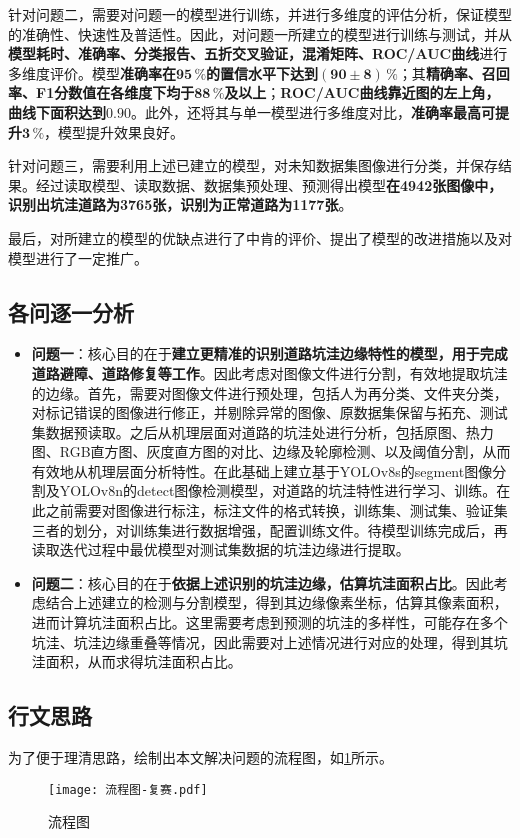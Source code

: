 \documentclass{MathorCupmodeling}
\begin{document}
		{\heiti 针对问题二}，需要对问题一的模型进行训练，并进行多维度的评估分析，保证模型的准确性、快速性及普适性。因此，对问题一所建立的模型进行训练与测试，并从\textbf{模型耗时、准确率、分类报告、五折交叉验证，混淆矩阵、ROC/AUC曲线}进行多维度评价。模型\textbf{准确率在$\boldsymbol{95\,\%}$的置信水平下达到$\boldsymbol{\left(90\pm 8\right)\,\%}$}；其\textbf{精确率、召回率、F1分数值在各维度下均于$\boldsymbol{88\,\%}$及以上}；\textbf{ROC/AUC曲线靠近图的左上角，曲线下面积达到$\boldsymbol{0.90}$}。此外，还将其与单一模型进行多维度对比，\textbf{准确率最高可提升$\boldsymbol{3\,\%}$}，模型提升效果良好。

		{\heiti 针对问题三}，需要利用上述已建立的模型，对未知数据集图像进行分类，并保存结果。经过读取模型、读取数据、数据集预处理、预测得出模型\textbf{在4942张图像中，识别出坑洼道路为3765张，识别为正常道路为1177张}。
		
		{\heiti 最后}，对所建立的模型的优缺点进行了中肯的评价、提出了模型的改进措施以及对模型进行了一定推广。
	\subsection{各问逐一分析}
	\begin{itemize}
		\item \textbf{问题一}：核心目的在于\textbf{建立更精准的识别道路坑洼边缘特性的模型，用于完成道路避障、道路修复等工作}。因此考虑对图像文件进行分割，有效地提取坑洼的边缘。首先，需要对图像文件进行预处理，包括人为再分类、文件夹分类，对标记错误的图像进行修正，并剔除异常的图像、原数据集保留与拓充、测试集数据预读取。之后从机理层面对道路的坑洼处进行分析，包括原图、热力图、RGB直方图、灰度直方图的对比、边缘及轮廓检测、以及阈值分割，从而有效地从机理层面分析特性。在此基础上建立基于YOLOv8s的segment图像分割及YOLOv8n的detect图像检测模型，对道路的坑洼特性进行学习、训练。在此之前需要对图像进行标注，标注文件的格式转换，训练集、测试集、验证集三者的划分，对训练集进行数据增强，配置训练文件。待模型训练完成后，再读取迭代过程中最优模型对测试集数据的坑洼边缘进行提取。
		\item \textbf{问题二}：核心目的在于\textbf{依据上述识别的坑洼边缘，估算坑洼面积占比}。因此考虑结合上述建立的检测与分割模型，得到其边缘像素坐标，估算其像素面积，进而计算坑洼面积占比。这里需要考虑到预测的坑洼的多样性，可能存在多个坑洼、坑洼边缘重叠等情况，因此需要对上述情况进行对应的处理，得到其坑洼面积，从而求得坑洼面积占比。
	\end{itemize}
	\subsection{行文思路}
	为了便于理清思路，绘制出本文解决问题的流程图，如\textcolor{blue}{\cref{fig:流程图}}所示。
	\begin{figure}[H]
		\centering
		\texttt{[image: 流程图-复赛.pdf]}
		\caption{流程图}
		\label{fig:流程图}
	\end{figure}
\end{document}
